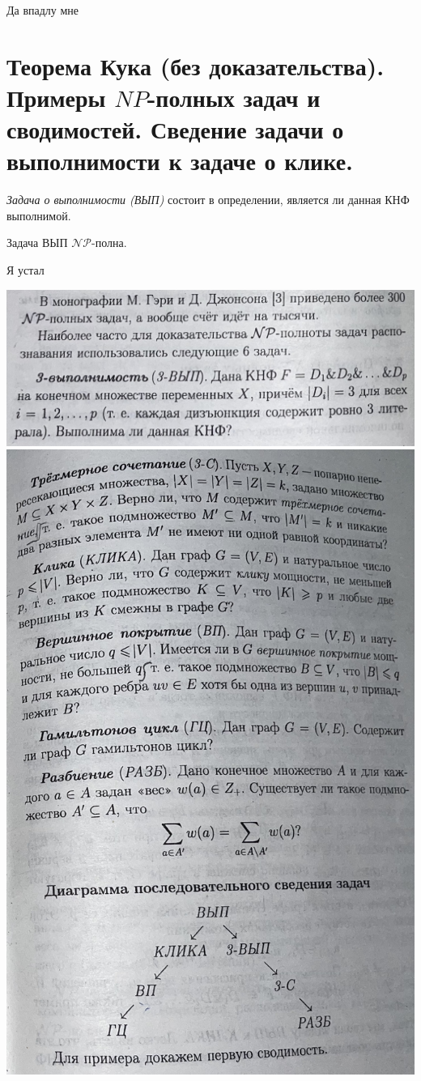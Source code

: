 \begin{note}
    Да впадлу мне
\end{note}

\section{Теорема Кука (без доказательства). Примеры $NP$-полных задач и сводимостей. Сведение задачи о выполнимости к задаче о клике.}

\begin{note}
    \emph{Задача о выполнимости (ВЫП)} состоит в определении, является ли данная КНФ выполнимой.
\end{note}

\begin{theorem}[Кука]
    Задача ВЫП $ \mathcal{NP} $-полна.
\end{theorem}

\begin{note}
    Я устал
    
    \includegraphics[scale=0.1]{../figures/need2.png}
    \includegraphics[scale=0.1]{../figures/need1.png}
\end{note}
